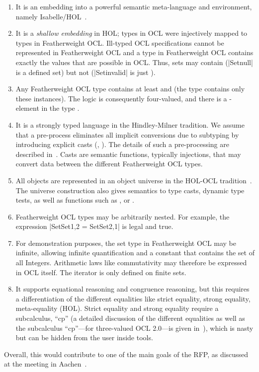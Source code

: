 \begin{enumerate}
\item It is an embedding into a powerful semantic meta-language and
  environment, namely
  Isabelle/HOL~\cite{nipkow.ea:isabelle:2002}.
\item It is a \emph{shallow embedding} in HOL; types
  in OCL were injectively mapped to types in Featherweight
  OCL\@. Ill-typed OCL specifications cannot be represented in
  Featherweight OCL and a type in Featherweight OCL contains exactly
  the values that are possible in OCL\@. Thus, sets may contain
   (\inlineocl|Set{null}| is a defined set) but not
   (\inlineocl|Set{invalid}| is just
  ).
\item Any Featherweight OCL type contains at least
   and  (the type 
  contains only these instances). The logic is consequently
  four-valued, and there is a -element in the type
  .
\item It is a strongly typed language in the Hindley-Milner tradition.
  We assume that a pre-process eliminates all implicit conversions due
  to subtyping by introducing explicit casts (\eg,
  ). The details of such a pre-processing are
  described in~\cite{brucker:interactive:2007}.  Casts are semantic
  functions, typically injections, that may convert data between the
  different Featherweight OCL types.
\item All objects are represented in an object universe in the HOL-OCL
  tradition~\cite{brucker.ea:extensible:2008-b}. The universe
  construction also gives semantics to type casts, dynamic type
  tests, as well as functions such as ,
  or .
\item Featherweight OCL types may be arbitrarily nested. For example,
  the expression
  \inlineocl|Set{Set{1,2}} = Set{Set{2,1}}| is legal and true.
\item For demonstration purposes, the set type in Featherweight OCL
  may be infinite, allowing infinite quantification and a constant
  that contains the set of all Integers.  Arithmetic laws like
  commutativity may therefore be expressed in OCL itself.  The
  iterator is only defined on finite sets.
\item It supports equational reasoning and congruence reasoning, but
  this requires a differentiation of the different equalities like
  strict equality, strong equality, meta-equality (HOL). Strict
  equality and strong equality require a subcalculus, ``cp'' (a
  detailed discussion of the different equalities as well as the
  subcalculus ``cp''---for three-valued OCL 2.0---is given
  in~\cite{brucker.ea:semantics:2009}), which is nasty but can be
  hidden from the user inside tools.
\end{enumerate}
Overall, this would contribute to one of the main goals of the 
RFP, as discussed at the \OCL meeting in
Aachen~\cite{brucker.ea:summary-aachen:2013}.
\endisatagafp



